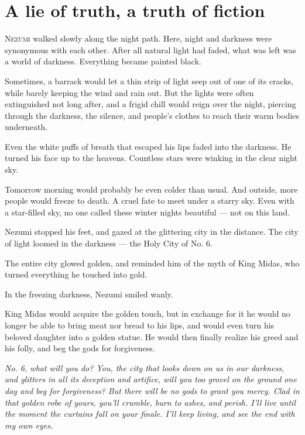 
\chapter{A lie of truth, a truth of fiction}


\lettrine{N}{ezumi} walked slowly along the night path. Here, night and darkness were
synonymous with each other. After all natural light had faded, what was
left was a world of darkness. Everything became painted black.

Sometimes, a barrack would let a thin strip of light seep out of one of
its cracks, while barely keeping the wind and rain out. But the lights
were often extinguished not long after, and a frigid chill would reign
over the night, piercing through the darkness, the silence, and people's
clothes to reach their warm bodies underneath.

Even the white puffs of breath that escaped his lips faded into the
darkness. He turned his face up to the heavens. Countless stars were
winking in the clear night sky.

Tomorrow morning would probably be even colder than usual. And outside,
more people would freeze to death. A cruel fate to meet under a starry
sky. Even with a star-filled sky, no one called these winter nights
beautiful --- not on this land.

Nezumi stopped his feet, and gazed at the glittering city in the
distance. The city of light loomed in the darkness --- the Holy City of
No. 6.

The entire city glowed golden, and reminded him of the myth of King
Midas, who turned everything he touched into gold.

In the freezing darkness, Nezumi smiled wanly.

King Midas would acquire the golden touch, but in exchange for it he
would no longer be able to bring meat nor bread to his lips, and would
even turn his beloved daughter into a golden statue. He would then
finally realize his greed and his folly, and beg the gods for
forgiveness.

\emph{No. 6, what will you do? You, the city that looks down on us in our
darkness, and glitters in all its deception and artifice, will you too
grovel on the ground one day and beg for forgiveness? But there will be
no gods to grant you mercy. Clad in that golden robe of yours, you'll
crumble, burn to ashes, and perish. I'll live until the moment the
curtains fall on your finale. I'll keep living, and see the end with my
own eyes.}

